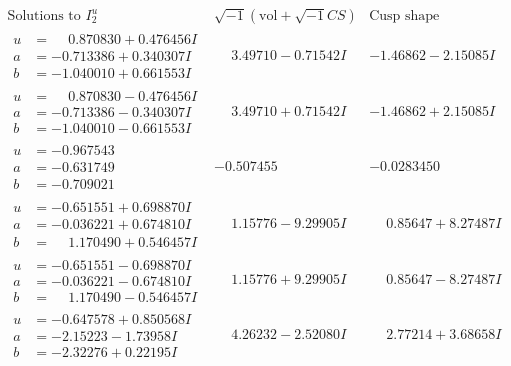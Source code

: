 \documentclass[1p]{elsarticle_modified}
\theoremstyle{definition}
\newcommand{\I}{\sqrt{-1}}
\begin{document}
$$\begin{array}{c|c|c}  
\text{Solutions to }I^u_{2}& \I (\text{vol} + \sqrt{-1}CS) & \text{Cusp shape}\\
 \hline 
\begin{aligned}
u &= \phantom{-}0.870830 + 0.476456 I \\
a &= -0.713386 + 0.340307 I \\
b &= -1.040010 + 0.661553 I\end{aligned}
 & \phantom{-}3.49710 - 0.71542 I & -1.46862 - 2.15085 I \\ \hline\begin{aligned}
u &= \phantom{-}0.870830 - 0.476456 I \\
a &= -0.713386 - 0.340307 I \\
b &= -1.040010 - 0.661553 I\end{aligned}
 & \phantom{-}3.49710 + 0.71542 I & -1.46862 + 2.15085 I \\ \hline\begin{aligned}
u &= -0.967543\phantom{ +0.000000I} \\
a &= -0.631749\phantom{ +0.000000I} \\
b &= -0.709021\phantom{ +0.000000I}\end{aligned}
 & -0.507455\phantom{ +0.000000I} & -0.0283450\phantom{ +0.000000I} \\ \hline\begin{aligned}
u &= -0.651551 + 0.698870 I \\
a &= -0.036221 + 0.674810 I \\
b &= \phantom{-}1.170490 + 0.546457 I\end{aligned}
 & \phantom{-}1.15776 - 9.29905 I & \phantom{-}0.85647 + 8.27487 I \\ \hline\begin{aligned}
u &= -0.651551 - 0.698870 I \\
a &= -0.036221 - 0.674810 I \\
b &= \phantom{-}1.170490 - 0.546457 I\end{aligned}
 & \phantom{-}1.15776 + 9.29905 I & \phantom{-}0.85647 - 8.27487 I \\ \hline\begin{aligned}
u &= -0.647578 + 0.850568 I \\
a &= -2.15223 - 1.73958 I \\
b &= -2.32276 + 0.22195 I\end{aligned}
 & \phantom{-}4.26232 - 2.52080 I & \phantom{-}2.77214 + 3.68658 I \\ \hline\begin{aligned}

\end{aligned}
\end{array}$$
\end{document}
